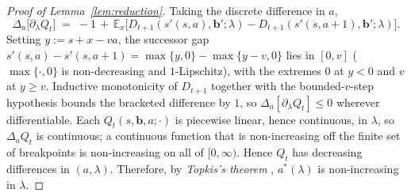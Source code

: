 \documentclass[preprint,11pt,authoryear]{elsarticle}
\newcommand{\bvec}[1]{\mathbf{#1}}
\theoremstyle{remark}
\begin{document}
\begin{proof}[Proof of Lemma~\ref{lem:reduction}]
Taking the discrete difference in $a$,
\[
\Delta_a\!\bigl[\partial_\lambda Q_t\bigr] \;=\; -1 \,+\, \mathbb{E}_x\bigl[D_{t+1}(s'(s,a), \bvec{b}'; \lambda) - D_{t+1}(s'(s,a+1), \bvec{b}'; \lambda)\bigr].
\]
Setting $y := s+x-va$, the successor gap $s'(s,a) - s'(s,a+1) = \max\{y,0\} - \max\{y-v,0\}$ lies in $[0, v]$ ($\max\{\cdot,0\}$ is non-decreasing and $1$-Lipschitz), with the extremes $0$ at $y < 0$ and $v$ at $y \ge v$. Inductive monotonicity of $D_{t+1}$ together with the bounded-$v$-step hypothesis bounds the bracketed difference by $1$, so $\Delta_a[\partial_\lambda Q_t]\le0$ wherever differentiable. Each $Q_t(s,\bvec{b},a;\cdot)$ is piecewise linear, hence continuous, in $\lambda$, so $\Delta_a Q_t$ is continuous; a continuous function that is non-increasing off the finite set of breakpoints is non-increasing on all of $[0,\infty)$. Hence $Q_t$ has decreasing differences in $(a,\lambda)$. Therefore, by \textit{Topkis's theorem} \citep{topkis1998supermodularity}, $a^*(\lambda)$ is non-increasing in $\lambda$.
\end{proof}
\end{document}
